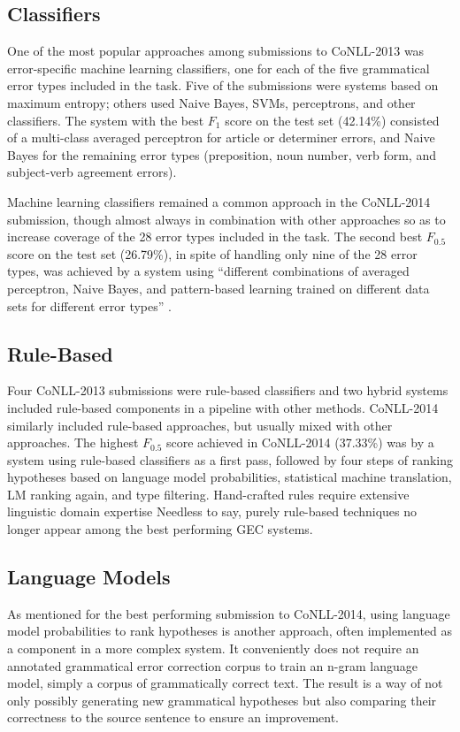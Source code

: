 \subsection{Classifiers}
One of the most popular approaches among submissions to CoNLL-2013 was error-specific machine learning classifiers, one for each of the five grammatical error types included in the task. Five of the submissions were systems based on maximum entropy; others used Naive Bayes, SVMs, perceptrons, and other classifiers. The system with the best $F_1$ score on the test set (42.14\%) consisted of a multi-class averaged perceptron for article or determiner errors, and Naive Bayes for the remaining error types (preposition, noun number, verb form, and subject-verb agreement errors).

Machine learning classifiers remained a common approach in the CoNLL-2014 submission, though almost always in combination with other approaches so as to increase coverage of the 28 error types included in the task. The second best $F_{0.5}$ score on the test set (26.79\%), in spite of handling only nine of the 28 error types, was achieved by a system using ``different combinations of averaged perceptron, Naive Bayes, and pattern-based learning trained on different data sets for different error types'' \citep{Ng2014TheCorrection}.

\subsection{Rule-Based}
Four CoNLL-2013 submissions were rule-based classifiers and two hybrid systems included rule-based components in a pipeline with other methods. CoNLL-2014 similarly included rule-based approaches, but usually mixed with other approaches. The highest $F_{0.5}$ score achieved in CoNLL-2014 (37.33\%) was by a system using rule-based classifiers as a first pass, followed by four steps of ranking hypotheses based on language model probabilities, statistical machine translation, LM ranking again, and type filtering. Hand-crafted rules require extensive linguistic domain expertise Needless to say, purely rule-based techniques no longer appear among the best performing GEC systems.

\subsection{Language Models}
As mentioned for the best performing submission to CoNLL-2014, using language model probabilities to rank hypotheses is another approach, often implemented as a component in a more complex system. It conveniently does not require an annotated grammatical error correction corpus to train an n-gram language model, simply a corpus of grammatically correct text. The result is a way of not only possibly generating new grammatical hypotheses but also comparing their correctness to the source sentence to ensure an improvement.

